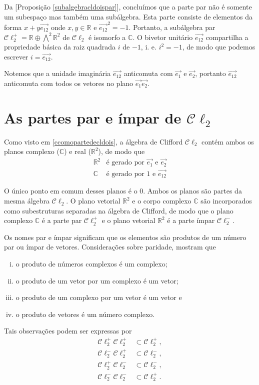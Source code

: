 \documentclass[12pt, oneside, a4paper, english, brazil]{abntex2}
\providecommand{\R}{\mathbb{R}}
\providecommand{\Rdois}{\mathbb{R}^2}
\newcommand{\C}{\mathbb{C}}
\providecommand{\Cldois}{\mathcal{C}\ell_2}
\providecommand{\Cldoispar}{\mathcal{C}\ell_2^{+}}
\providecommand{\Cldoisimpar}{\mathcal{C}\ell_2^{-}}
\renewcommand{\vec}{\overrightarrow}
\providecommand{\propositionref}[1]{[Proposição \ref{#1}]}
\theoremstyle{normal}
\theoremstyle{observacao}
\begin{document}
Da \propositionref{subalgebracldoispar}, concluímos que a parte par não é somente um subespaço mas também uma subálgebra. Esta parte consiste de elementos da forma $x+y\vec{e_{12}}$ onde $x, y \in \R$ e $\vec{e_{12}}^2 = -1$. Portanto, a subálgebra par $\Cldoispar = \R \oplus \bigwedge^2 \R^2$ de $\Cldois$ é isomorfo a $\C$. O bivetor unitário $\vec{e_{12}}$ compartilha a propriedade básica da raiz quadrada $i$ de $-1$, i. e. $i^2= -1$, de modo que podemos escrever $i=\vec{e_{12}}$.

Notemos que a unidade imaginária $\vec{e_{12}}$ anticomuta com $\vec{e_1}$ e $\vec{e_2}$, portanto $\vec{e_{12}}$ anticomuta com todos os vetores no plano $\vec{e_1}\vec{e_2}$.

\section{As partes par e ímpar de $\Cldois$}

Como visto em \ref{ccomopartedecldois}, a álgebra de Clifford $\Cldois$ contém ambos os planos complexo ($\C$) e real ($\Rdois$), de modo que 
\[
\begin{array}{ll}
\Rdois & \text{é gerado por } \vec{e_1} \text{ e } \vec{e_2}\\
\C & \text{é gerado por } 1 \text{ e } \vec{e_{12}}
\end{array}
\]

O único ponto em comum desses planos é o $0$. Ambos os planos são partes da mesma álgebra $\Cldois$. O plano vetorial $\Rdois$ e o corpo complexo $\C$ são incorporados como subestruturas separadas na álgebra de Clifford, de modo que o plano complexo $\C$ é a parte par $\Cldoispar$ e o plano vetorial $\Rdois$ é a parte ímpar $\Cldoisimpar$.

Os nomes par e ímpar significam que os elementos são produtos de um número par ou ímpar de vetores. Considerações sobre paridade, mostram que 
\begin{enumerate}[i.]
\item o produto de números complexos é um complexo;
\item o produto de um vetor por um complexo é um vetor;
\item o produto de um complexo por um vetor é um vetor e
\item o produto de vetores é um número complexo.
\end{enumerate}

Tais observações podem ser expressas por 
\begin{align*}
\Cldoispar\Cldoispar &\subset \Cldoispar ,\\
\Cldoisimpar\Cldoispar &\subset \Cldoisimpar, \\
\Cldoispar\Cldoisimpar &\subset \Cldoisimpar, \\
\Cldoisimpar\Cldoisimpar &\subset \Cldoispar.
\end{align*}
\end{document}
